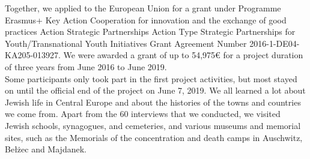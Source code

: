 Together, we applied to the European Union for a grant under Programme Erasmus+ Key Action Cooperation for innovation and the exchange of good practices Action Strategic Partnerships Action Type Strategic Partnerships for Youth/Transnational Youth Initiatives Grant Agreement Number 2016-1-DE04-KA205-013927. We were awarded a grant of up to 54,975\euro{} for a project duration of three years from June 2016 to June 2019. \\
Some participants only took part in the first project activities, but most stayed on until the official end of the project on June 7, 2019. We all learned a lot about Jewish life in Central Europe and about the histories of the towns and countries we come from. Apart from the 60 interviews that we conducted, we visited Jewish schools, synagogues, and cemeteries, and various museums and memorial sites, such as the Memorials of the concentration and death camps in Auschwitz, Bełżec and Majdanek. 
